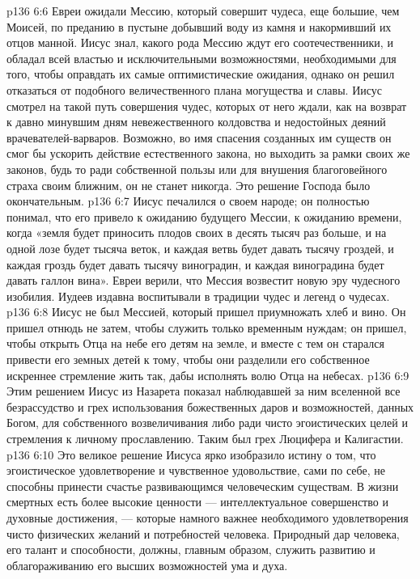 \vs p136 6:6 Евреи ожидали Мессию, который совершит чудеса, еще большие, чем Моисей, по преданию в пустыне добывший воду из камня и накормивший их отцов манной. Иисус знал, какого рода Мессию ждут его соотечественники, и обладал всей властью и исключительными возможностями, необходимыми для того, чтобы оправдать их самые оптимистические ожидания, однако он решил отказаться от подобного величественного плана могущества и славы. Иисус смотрел на такой путь совершения чудес, которых от него ждали, как на возврат к давно минувшим дням невежественного колдовства и недостойных деяний врачевателей\hyp{}варваров. Возможно, во имя спасения созданных им существ он смог бы ускорить действие естественного закона, но выходить за рамки своих же законов, будь то ради собственной пользы или для внушения благоговейного страха своим ближним, он не станет никогда. Это решение Господа было окончательным.
\vs p136 6:7 Иисус печалился о своем народе; он полностью понимал, что его привело к ожиданию будущего Мессии, к ожиданию времени, когда «земля будет приносить плодов своих в десять тысяч раз больше, и на одной лозе будет тысяча веток, и каждая ветвь будет давать тысячу гроздей, и каждая гроздь будет давать тысячу виноградин, и каждая виноградина будет давать галлон вина». Евреи верили, что Мессия возвестит новую эру чудесного изобилия. Иудеев издавна воспитывали в традиции чудес и легенд о чудесах.
\vs p136 6:8 Иисус не был Мессией, который пришел приумножать хлеб и вино. Он пришел отнюдь не затем, чтобы служить только временным нуждам; он пришел, чтобы открыть Отца на небе его детям на земле, и вместе с тем он старался привести его земных детей к тому, чтобы они разделили его собственное искреннее стремление жить так, дабы исполнять волю Отца на небесах.
\vs p136 6:9 \pc Этим решением Иисус из Назарета показал наблюдавшей за ним вселенной все безрассудство и грех использования божественных даров и возможностей, данных Богом, для собственного возвеличивания либо ради чисто эгоистических целей и стремления к личному прославлению. Таким был грех Люцифера и Калигастии.
\vs p136 6:10 Это великое решение Иисуса ярко изобразило истину о том, что эгоистическое удовлетворение и чувственное удовольствие, сами по себе, не способны принести счастье развивающимся человеческим существам. В жизни смертных есть более высокие ценности --- интеллектуальное совершенство и духовные достижения, --- которые намного важнее необходимого удовлетворения чисто физических желаний и потребностей человека. Природный дар человека, его талант и способности, должны, главным образом, служить развитию и облагораживанию его высших возможностей ума и духа.
